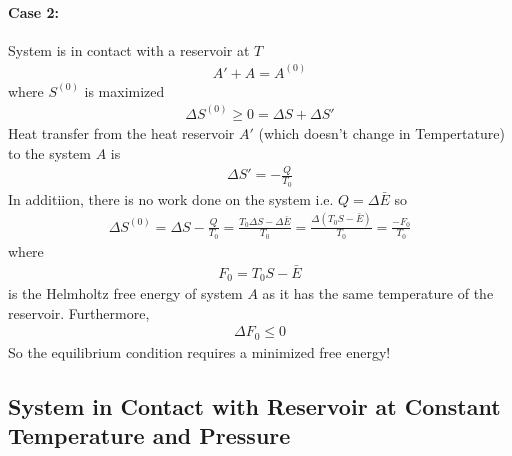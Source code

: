 \documentclass[../main.tex]{subfiles}
\begin{document}
\paragraph{Case 2:} System is in contact with a reservoir at $T$
\begin{align*}
    A' + A = A^{(0)}
\end{align*}
where $S^{(0)}$ is maximized
\begin{align*}
    \Delta S^{(0)} \geq 0 = \Delta S + \Delta S'
\end{align*}
Heat transfer from the heat reservoir $A'$ (which doesn't change in Tempertature) to the system $A$ is
\begin{align*}
    \Delta S' = -\frac{Q}{T_0}
\end{align*}
In additiion, there is no work done on the system i.e. $Q = \Delta \bar E$ so
\begin{align*}
    \Delta S^{(0)} = \Delta S - \frac{Q}{T_0} = \frac{T_0 \Delta S - \Delta \bar E}{T_0} = \frac{\Delta (T_0 S - \bar E)}{T_0} 
    = \frac{-F_0}{T_0}
\end{align*}
where
\begin{align*}
    F_0 = T_0 S - \bar E
\end{align*}
is the Helmholtz free energy of system $A$ as it has the same temperature of the reservoir. 
Furthermore,
\begin{align*}
    \Delta F_0 \leq 0
\end{align*}
So the equilibrium condition requires a minimized free energy!

\newpage
{}

\subsection{System in Contact with Reservoir at Constant Temperature and Pressure}
\end{document}
